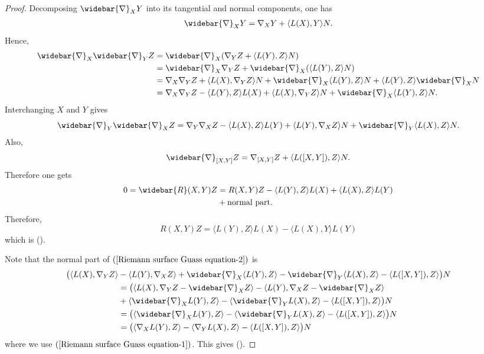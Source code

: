 \begin{proof}
Decomposing $\widebar{\nabla}_XY$ into its tangential and normal components, one has
\begin{align}\label{Riemann surface Guass equation-1}
\widebar{\nabla}_XY=\nabla_XY+\langle L(X),Y\rangle N.
\end{align}
Hence,
\begin{align*}
\widebar{\nabla}_X\widebar{\nabla}_YZ&=\widebar{\nabla}_X(\nabla_YZ+\langle L(Y),Z\rangle N)\\
&=\widebar{\nabla}_X\nabla_YZ+\widebar{\nabla}_X(\langle L(Y),Z\rangle N)\\
&=\nabla_X\nabla_YZ+\langle L(X),\nabla_YZ\rangle N+\widebar{\nabla}_X\langle L(Y),Z\rangle N+\langle L(Y),Z\rangle\widebar{\nabla}_XN\\
&=\nabla_X\nabla_YZ-\langle L(Y),Z\rangle L(X)+\langle L(X),\nabla_YZ\rangle N+\widebar{\nabla}_X\langle L(Y),Z\rangle N.
\end{align*}
Interchanging $X$ and $Y$ gives
\[\widebar{\nabla}_Y\widebar{\nabla}_XZ=\nabla_Y\nabla_XZ-\langle L(X),Z\rangle L(Y)+\langle L(Y),\nabla_XZ\rangle N+\widebar{\nabla}_Y\langle L(X),Z\rangle N.\]
Also,
\[\widebar{\nabla}_{[X,Y]}Z=\nabla_{[X,Y]}Z+\langle L([X,Y]),Z\rangle N.\]
Therefore one gets
\begin{equation}\label{Riemann surface Guass equation-2}
\begin{aligned}
0=\widebar{R}(X,Y)Z&=R(X,Y)Z-\langle L(Y),Z\rangle L(X)+\langle L(X),Z\rangle L(Y)\\
&+\text{normal part}.
\end{aligned}
\end{equation}
Therefore,
\[R(X,Y)Z=\langle L(Y),Z\rangle L(X)-\langle L(X),Y\rangle L(Y)\]
which is ().\par
Note that the normal part of $(\ref{Riemann surface Guass equation-2})$ is 
\begin{align*}
\big(\langle L(X),\nabla_YZ\rangle&-\langle L(Y),\nabla_XZ\rangle+\widebar{\nabla}_X\langle L(Y),Z\rangle-\widebar{\nabla}_Y\langle L(X),Z\rangle-\langle L([X,Y]),Z\rangle\big)N\\
&=\big(\langle L(X),\nabla_YZ-\widebar{\nabla}_XZ\rangle-\langle L(Y),\nabla_XZ-\widebar{\nabla}_XZ\rangle\\
&+\langle \widebar{\nabla}_XL(Y),Z\rangle-\langle \widebar{\nabla}_YL(X),Z\rangle-\langle L([X,Y]),Z\rangle\big)N\\
&=\big(\langle \widebar{\nabla}_XL(Y),Z\rangle-\langle \widebar{\nabla}_YL(X),Z\rangle-\langle L([X,Y]),Z\rangle\big)N\\
&=\big(\langle\nabla_XL(Y),Z\rangle-\langle\nabla_YL(X),Z\rangle-\langle L([X,Y]),Z\rangle\big)N
\end{align*}
where we use $(\ref{Riemann surface Guass equation-1})$. This gives ().
\end{proof}
